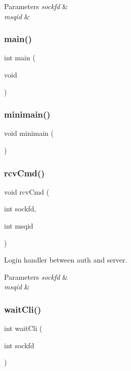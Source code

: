 \begin{DoxyParams}{Parameters}
{\em sockfd} & \\
\hline
{\em msqid} & \\
\hline
\end{DoxyParams}
\mbox{\label{srv_8c_ae66f6b31b5ad750f1fe042a706a4e3d4}} 
\subsubsection{main()}
{\footnotesize\ttfamily int main (\begin{DoxyParamCaption}\item[{void}]{ }\end{DoxyParamCaption})}

\mbox{\label{srv_8c_a6dcd28aa1f6d9481a210ca831514248b}} 
\subsubsection{minimain()}
{\footnotesize\ttfamily void minimain (\begin{DoxyParamCaption}{ }\end{DoxyParamCaption})}

\mbox{\label{srv_8c_a0f2216ae019052f383a3ed9f03df052e}} 
\subsubsection{rcv\+Cmd()}
{\footnotesize\ttfamily void rcv\+Cmd (\begin{DoxyParamCaption}\item[{int}]{sockfd,  }\item[{int}]{msqid }\end{DoxyParamCaption})}



Login handler between auth and server. 


\begin{DoxyParams}{Parameters}
{\em sockfd} & \\
\hline
{\em msqid} & \\
\hline
\end{DoxyParams}
\mbox{\label{srv_8c_a3ce2890f28931d91797e27834f0a1bfa}} 
\subsubsection{wait\+Cli()}
{\footnotesize\ttfamily int wait\+Cli (\begin{DoxyParamCaption}\item[{int}]{sockfd }\end{DoxyParamCaption})}




